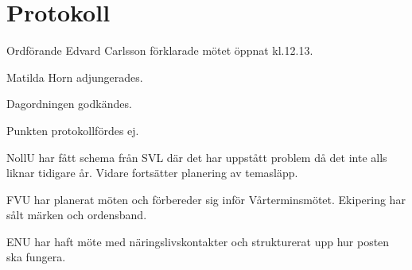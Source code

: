 \documentclass[10pt]{article}
\def\mo{Edvard Carlsson}
\begin{document}
\section*{Protokoll}
\begin{paragrafer}
Ordförande {\mo} förklarade mötet öppnat kl.12.13.

{\valavmo}

{\valavms}

{\valavj}

{\tosg}

Matilda Horn adjungerades.


Dagordningen godkändes.


\textit{\ingaprot}

\begin{fyllnadsval} %
\end{fyllnadsval}

\begin{paragrafer}
Punkten protokollfördes ej.

NollU har fått schema från SVL där det har uppstått problem då det inte alls liknar tidigare år. Vidare fortsätter planering av temasläpp. 

FVU har planerat möten och förbereder sig inför Vårterminsmötet. Ekipering har sålt märken och ordensband. 

ENU har haft möte med näringslivskontakter och strukturerat upp hur posten ska fungera. 


\end{paragrafer}
\end{paragrafer}
\end{document}
